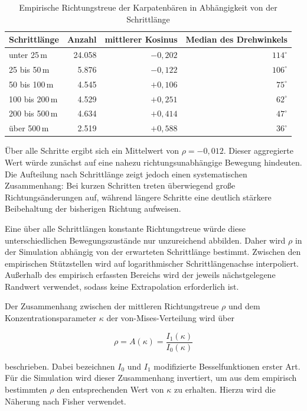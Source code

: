 \documentclass[12pt,a4paper]{report}
\begin{document}
\begin{table}[htbp]
\centering
\caption{Empirische Richtungstreue der Karpatenbären in Abhängigkeit von der
Schrittlänge}
\label{tab:richtungstreue}
\small
\begin{tabular}{l r r r}
\toprule
\textbf{Schrittlänge} &
\textbf{Anzahl} &
\textbf{mittlerer Kosinus} &
\textbf{Median des Drehwinkels} \\
\midrule
unter 25\,m      & 24.058 & $-0{,}202$ & $114^\circ$ \\
25 bis 50\,m     &  5.876 & $-0{,}122$ & $106^\circ$ \\
50 bis 100\,m    &  4.545 & $+0{,}106$ & $75^\circ$ \\
100 bis 200\,m   &  4.529 & $+0{,}251$ & $62^\circ$ \\
200 bis 500\,m   &  4.634 & $+0{,}414$ & $47^\circ$ \\
über 500\,m      &  2.519 & $+0{,}588$ & $36^\circ$ \\
\bottomrule
\end{tabular}
\end{table}

Über alle Schritte ergibt sich ein Mittelwert von $\rho=-0{,}012$. Dieser
aggregierte Wert würde zunächst auf eine nahezu richtungsunabhängige Bewegung
hindeuten. Die Aufteilung nach Schrittlänge zeigt jedoch einen systematischen
Zusammenhang: Bei kurzen Schritten treten überwiegend große Richtungsänderungen
auf, während längere Schritte eine deutlich stärkere Beibehaltung der bisherigen
Richtung aufweisen.

Eine über alle Schrittlängen konstante Richtungstreue würde diese unterschiedlichen
Bewegungszustände nur unzureichend abbilden. Daher wird $\rho$ in der Simulation
abhängig von der erwarteten Schrittlänge bestimmt. Zwischen den empirischen
Stützstellen wird auf logarithmischer Schrittlängenachse interpoliert. Außerhalb
des empirisch erfassten Bereichs wird der jeweils nächstgelegene Randwert
verwendet, sodass keine Extrapolation erforderlich ist.

Der Zusammenhang zwischen der mittleren Richtungstreue $\rho$ und dem
Konzentrationsparameter $\kappa$ der von-Mises-Verteilung wird über

\begin{equation}
\rho = A(\kappa)
=
\frac{I_1(\kappa)}{I_0(\kappa)}
\label{eq:rho}
\end{equation}

beschrieben. Dabei bezeichnen $I_0$ und $I_1$ modifizierte Besselfunktionen
erster Art. Für die Simulation wird dieser Zusammenhang invertiert, um aus dem
empirisch bestimmten $\rho$ den entsprechenden Wert von $\kappa$ zu erhalten.
Hierzu wird die Näherung nach Fisher verwendet.
\end{document}

